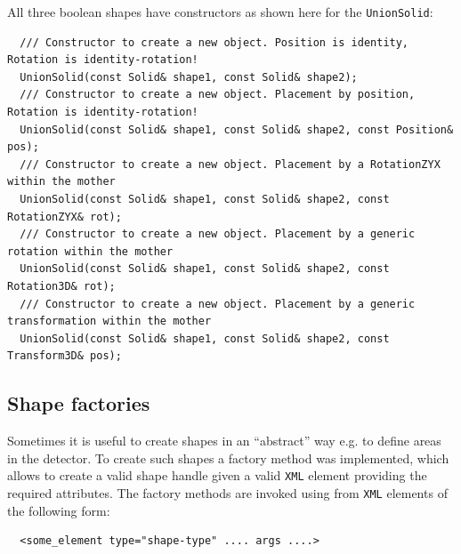 All three boolean shapes have constructors as shown here for the \texttt{UnionSolid}:
\begin{verbatim}
  /// Constructor to create a new object. Position is identity, Rotation is identity-rotation!
  UnionSolid(const Solid& shape1, const Solid& shape2);
  /// Constructor to create a new object. Placement by position, Rotation is identity-rotation!
  UnionSolid(const Solid& shape1, const Solid& shape2, const Position& pos);
  /// Constructor to create a new object. Placement by a RotationZYX within the mother
  UnionSolid(const Solid& shape1, const Solid& shape2, const RotationZYX& rot);
  /// Constructor to create a new object. Placement by a generic rotation within the mother
  UnionSolid(const Solid& shape1, const Solid& shape2, const Rotation3D& rot);
  /// Constructor to create a new object. Placement by a generic transformation within the mother
  UnionSolid(const Solid& shape1, const Solid& shape2, const Transform3D& pos);
\end{verbatim}
\newpage

\subsection{Shape factories} 
Sometimes it is useful to create shapes in an ``abstract'' way e.g. to define areas in the detector. To create such shapes a factory method was implemented, which allows to create a valid shape handle given a valid \texttt{XML} element providing the required attributes. The factory methods are invoked using from \texttt{XML} elements of the following form:
\begin{verbatim}
  <some_element type="shape-type" .... args ....>
\end{verbatim}

